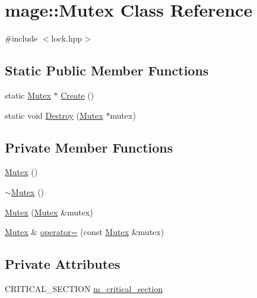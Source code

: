 \hypertarget{classmage_1_1_mutex}{}\section{mage\+:\+:Mutex Class Reference}
\label{classmage_1_1_mutex}


{\ttfamily \#include $<$lock.\+hpp$>$}

\subsection*{Static Public Member Functions}
\begin{DoxyCompactItemize}
\item 
static \hyperlink{classmage_1_1_mutex}{Mutex} $\ast$ \hyperlink{classmage_1_1_mutex_a48d784fa6bffd4088d9f89a2a9cca84e}{Create} ()
\item 
static void \hyperlink{classmage_1_1_mutex_a78cd1aff434b1d7cefce4c8339c25d8f}{Destroy} (\hyperlink{classmage_1_1_mutex}{Mutex} $\ast$mutex)
\end{DoxyCompactItemize}
\subsection*{Private Member Functions}
\begin{DoxyCompactItemize}
\item 
\hyperlink{classmage_1_1_mutex_ab22db01311271ef54642b10ea53dfd8a}{Mutex} ()
\item 
\hyperlink{classmage_1_1_mutex_a143d82ec7bb43f953a1703caa7972e9d}{$\sim$\+Mutex} ()
\item 
\hyperlink{classmage_1_1_mutex_a0f38f170668eb1fe3c2f110738edc39e}{Mutex} (\hyperlink{classmage_1_1_mutex}{Mutex} \&mutex)
\item 
\hyperlink{classmage_1_1_mutex}{Mutex} \& \hyperlink{classmage_1_1_mutex_aeaab2190729234e0da465ed0196111f0}{operator=} (const \hyperlink{classmage_1_1_mutex}{Mutex} \&mutex)
\end{DoxyCompactItemize}
\subsection*{Private Attributes}
\begin{DoxyCompactItemize}
\item 
C\+R\+I\+T\+I\+C\+A\+L\+\_\+\+S\+E\+C\+T\+I\+ON \hyperlink{classmage_1_1_mutex_a18414337aef28b7ed261e7a805d2c103}{m\+\_\+critical\+\_\+section}
\end{DoxyCompactItemize}
